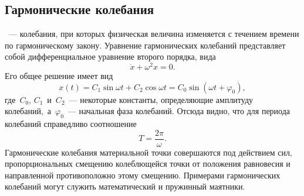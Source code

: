 \subsection{Гармонические колебания}
~--- колебания, при которых физическая величина изменяется с течением времени по гармоническому закону. Уравнение гармонических колебаний представляет собой дифференциальное уравнение второго порядка, вида
\begin{equation}
	\ddot{x} + \omega^2 x = 0.
\end{equation}
Его общее решение имеет вид
\begin{equation}
	x(t) = C_1 \sin \omega t + C_2 \cos \omega t = C_0 \sin (\omega t + \varphi_0),
\end{equation}
где~$C_0$, $C_1$~и~$C_2$~--- некоторые константы, определяющие амплитуду колебаний,~а~$\varphi_0$~--- начальная фаза колебаний. Отсюда видно, что для периода колебаний справедливо соотношение
\begin{equation}
	T = \frac{2 \pi}{\omega}.
\end{equation}
Гармонические колебания материальной точки совершаются под действием сил, пропорциональных смещению колеблющейся точки от положения равновесия и направленной противоположно этому смещению. Примерами гармонических колебаний могут служить математический и пружинный маятники.